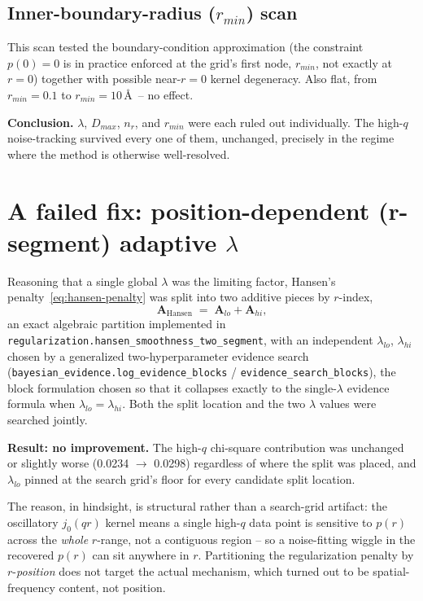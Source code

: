 \documentclass[11pt,a4paper]{article}
\begin{document}
\subsection{Inner-boundary-radius ($r_{min}$) scan}

This scan tested the boundary-condition approximation (the constraint
$p(0)=0$ is in practice enforced at the grid's first node, $r_{min}$,
not exactly at $r = 0$) together with possible near-$r=0$ kernel
degeneracy. Also flat, from $r_{min} = 0.1$ to $r_{min} = 10$\,\AA\ --
no effect.

\medskip
\noindent\textbf{Conclusion.} $\lambda$, $D_{max}$, $n_r$, and
$r_{min}$ were each ruled out individually. The high-$q$
noise-tracking survived every one of them, unchanged, precisely in the
regime where the method is otherwise well-resolved.

\section{A failed fix: position-dependent (r-segment) adaptive $\lambda$}
\label{sec:adaptive}

Reasoning that a single global $\lambda$ was the limiting factor,
Hansen's penalty~\eqref{eq:hansen-penalty} was split into two additive
pieces by $r$-index,
\begin{equation}
  \mathbf{A}_{\text{Hansen}} \;=\; \mathbf{A}_{lo} + \mathbf{A}_{hi} ,
\end{equation}
an exact algebraic partition implemented in
\texttt{regularization.hansen\_smoothness\_two\_segment}, with an
independent $\lambda_{lo}$, $\lambda_{hi}$ chosen by a generalized
two-hyperparameter evidence search
(\texttt{bayesian\_evidence.log\_evidence\_blocks} /
\texttt{evidence\_search\_blocks}), the block formulation chosen so
that it collapses exactly to the single-$\lambda$ evidence formula
when $\lambda_{lo} = \lambda_{hi}$. Both the split location and the
two $\lambda$ values were searched jointly.

\textbf{Result: no improvement.} The high-$q$ chi-square contribution
was unchanged or slightly worse (0.0234 $\to$ 0.0298) regardless of
where the split was placed, and $\lambda_{lo}$ pinned at the search
grid's floor for every candidate split location.

The reason, in hindsight, is structural rather than a search-grid
artifact: the oscillatory $j_0(qr)$ kernel means a single high-$q$
data point is sensitive to $p(r)$ across the \emph{whole} $r$-range,
not a contiguous region -- so a noise-fitting wiggle in the recovered
$p(r)$ can sit anywhere in $r$. Partitioning the regularization
penalty by $r$-\emph{position} does not target the actual mechanism,
which turned out to be spatial-frequency content, not position.
\end{document}
